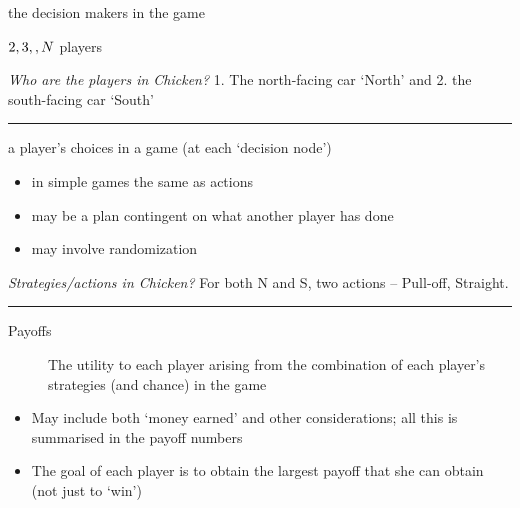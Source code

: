 \documentclass[]{article}
\providecommand{\tightlist}{%
  \setlength{\itemsep}{0pt}\setlength{\parskip}{0pt}}
\begin{document}
\begin{description}
\tightlist
\item[Players]
the decision makers in the game
\end{description}

\bigskip

\(2, 3, \bigskip, N\) players

\bigskip

\emph{Who are the players in Chicken?} 1. The north-facing car `North'
and 2. the south-facing car `South'

\begin{center}\rule{0.5\linewidth}{\linethickness}\end{center}

\begin{description}
\tightlist
\item[Strategies]
a player's choices in a game (at each `decision node')
\end{description}

\begin{itemize}
\tightlist
\item
  in simple games the same as actions
\item
  may be a plan contingent on what another player has done
\item
  may involve randomization
\end{itemize}

\bigskip

\emph{Strategies/actions in Chicken?} For both N and S, two actions --
Pull-off, Straight.

\begin{center}\rule{0.5\linewidth}{\linethickness}\end{center}

\begin{description}
\item[Payoffs]
The utility to each player arising from the combination of each player's
strategies (and chance) in the game
\end{description}

\begin{itemize}
\item
  May include both `money earned' and other considerations; all this is
  summarised in the payoff numbers
\item
  The goal of each player is to obtain the largest payoff that she can
  obtain (not just to `win')
\end{itemize}
\end{document}
